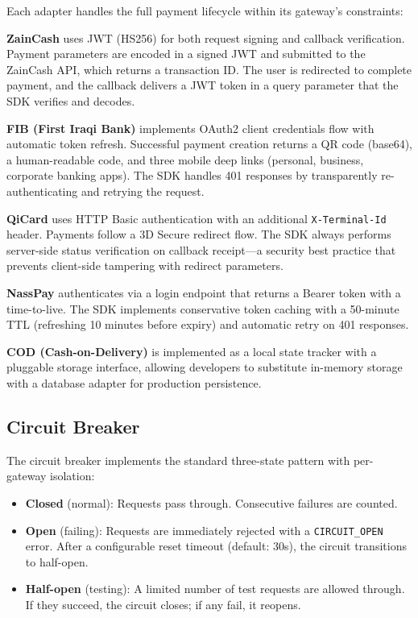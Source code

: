 \documentclass[preprint,12pt]{elsarticle}
\begin{document}
Each adapter handles the full payment lifecycle within its gateway's constraints:

\textbf{ZainCash} uses JWT (HS256) for both request signing and callback verification. Payment parameters are encoded in a signed JWT and submitted to the ZainCash API, which returns a transaction ID. The user is redirected to complete payment, and the callback delivers a JWT token in a query parameter that the SDK verifies and decodes.

\textbf{FIB (First Iraqi Bank)} implements OAuth2 client credentials flow with automatic token refresh. Successful payment creation returns a QR code (base64), a human-readable code, and three mobile deep links (personal, business, corporate banking apps). The SDK handles 401 responses by transparently re-authenticating and retrying the request.

\textbf{QiCard} uses HTTP Basic authentication with an additional \texttt{X-Terminal-Id} header. Payments follow a 3D Secure redirect flow. The SDK always performs server-side status verification on callback receipt---a security best practice that prevents client-side tampering with redirect parameters.

\textbf{NassPay} authenticates via a login endpoint that returns a Bearer token with a time-to-live. The SDK implements conservative token caching with a 50-minute TTL (refreshing 10 minutes before expiry) and automatic retry on 401 responses.

\textbf{COD (Cash-on-Delivery)} is implemented as a local state tracker with a pluggable storage interface, allowing developers to substitute in-memory storage with a database adapter for production persistence.

\subsection{Circuit Breaker}

The circuit breaker implements the standard three-state pattern with per-gateway isolation:

\begin{itemize}
\item \textbf{Closed} (normal): Requests pass through. Consecutive failures are counted.
\item \textbf{Open} (failing): Requests are immediately rejected with a \texttt{CIRCUIT\_OPEN} error. After a configurable reset timeout (default: 30s), the circuit transitions to half-open.
\item \textbf{Half-open} (testing): A limited number of test requests are allowed through. If they succeed, the circuit closes; if any fail, it reopens.
\end{itemize}
\end{document}
